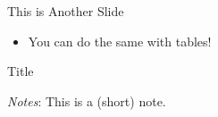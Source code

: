 \begin{frame}[label=section-anotherslide]{This is Another Slide}
    \begin{minipage}{0.49\linewidth}
        \begin{itemize}
            \item You can do the same with tables!
        \end{itemize}
    \end{minipage}
    \begin{minipage}{0.49\linewidth}
        \begin{table}[!tb]
            \centering
            \caption{Title}
            \begin{threeparttable}
                \small
                
                \begin{tablenotes}[flushleft]
                    \scriptsize{\item \textit{Notes}: This is a (short) note.}
                \end{tablenotes}
            \end{threeparttable}
        \end{table}
    \end{minipage}
\end{frame}